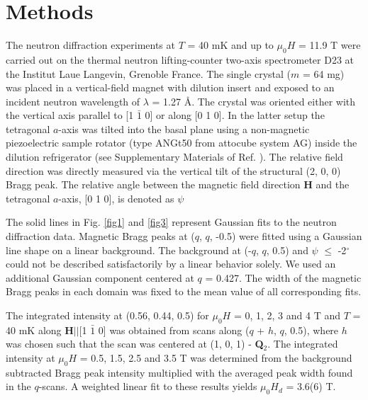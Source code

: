 \documentclass[article,twocolumn,showpacs,preprintnumbers,amsmath,amssymb, superscriptaddress]{revtex4-1}
\begin{document}
\section*{Methods}

The neutron diffraction experiments at $T$ = 40 mK and up to $\mu_0H$ = 11.9 T were carried out on the thermal neutron lifting-counter two-axis spectrometer D23 at the Institut Laue Langevin, Grenoble France. The single crystal ($m$ = 64 mg) was placed in a vertical-field magnet with dilution insert and exposed to an incident neutron wavelength of $\lambda$ = 1.27 \AA. The crystal was oriented either with the vertical axis parallel to [1 $\bar{1}$ 0] or along [0 1 0]. In the latter setup the tetragonal $a$-axis was tilted into the basal plane using a non-magnetic piezoelectric sample rotator (type ANGt50 from attocube system AG) inside the dilution refrigerator (see Supplementary Materials of Ref. \cite{Gerber2014}).  The relative field direction was directly measured via the vertical tilt of the structural (2, 0, 0) Bragg peak. The relative angle between the magnetic field direction \textbf{H} and the tetragonal $a$-axis, [0 1 0], is denoted as $\psi$

The solid lines in Fig. \ref{fig1} and \ref{fig3} represent Gaussian fits to the neutron diffraction data. Magnetic Bragg peaks at ($q$, $q$, -0.5) were fitted using a Gaussian line shape on a linear background. The background at  (-$q$, $q$, 0.5) and $\psi$ $\leq$ -2$^\circ$ could not be described satisfactorily by a linear behavior solely. We used an additional Gaussian component centered at $q$ = 0.427. The width of the magnetic Bragg peaks in each domain was fixed to the mean value of all corresponding fits.

The integrated intensity at (0.56, 0.44, 0.5) for $\mu_0H$ = 0, 1,  2, 3 and  4 T and $T$ = 40 mK along  \textbf{H}$||$[1 $\bar{1}$ 0] was obtained from scans along ($q$ + $h$, $q$, 0.5), where $h$ was chosen such that the scan was centered at (1, 0, 1) -  \textbf{Q$_2$}. The integrated intensity at $\mu_0H$ = 0.5, 1.5, 2.5 and 3.5 T was determined from the background subtracted Bragg peak intensity multiplied with the averaged peak width found in the $q$-scans. A weighted linear fit to these results yields $\mu_0H_d$ = 3.6(6) T.
\end{document}
